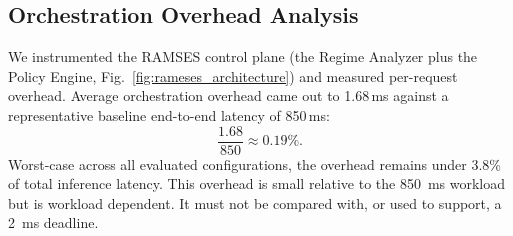\subsection{Orchestration Overhead Analysis}
We instrumented the RAMSES control plane (the Regime Analyzer plus the Policy Engine, Fig.~\ref{fig:rameses_architecture}) and measured per-request overhead. Average orchestration overhead came out to 1.68\,ms against a representative baseline end-to-end latency of 850\,ms:
\begin{equation}\label{eq:overhead}
\frac{1.68}{850} \approx 0.19\%.
\end{equation}
Worst-case across all evaluated configurations, the overhead remains
under 3.8\% of total inference latency.
This overhead is small relative to the 850~ms workload but is workload dependent. It must not be compared with, or used to support, a 2~ms deadline.

